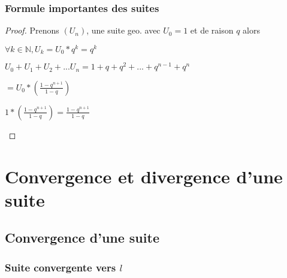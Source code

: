 \documentclass[a4paper,10pt]{book}
\begin{document}
  \subsection{Formule importantes des suites}
  \label{sub:Formule importantes des suites}

  \begin{proof}
    Prenons $(U_n)$, une suite geo. avec $U_0 = 1$ et de raison $q$ alors
    \begin{description}
      \item $\forall k \in \mathbb{N}, U_k = U_0 * q^k = q^k$
      \item $U_0 + U_1 + U_2 + ... U_n = 1 + q + q^2 + ... + q^{n-1} + q^n$
      \item $ = U_0 * (\frac{1-q^{n+1}}{1-q})$
      \item $1*(\frac{1-q^{n+1}}{1-q}) = \frac{1-q^{n+1}}{1-q}$
    \end{description}
  \end{proof}


  \chapter{Convergence et divergence d'une suite}
  \label{chap:Convergence et divergence d'une suite}

  \section{Convergence d'une suite}
  \label{sec:Convergence d'une suite}

  \subsection{Suite convergente vers $l$}
  \label{sub:Suite convergente vers l}
\end{document}
